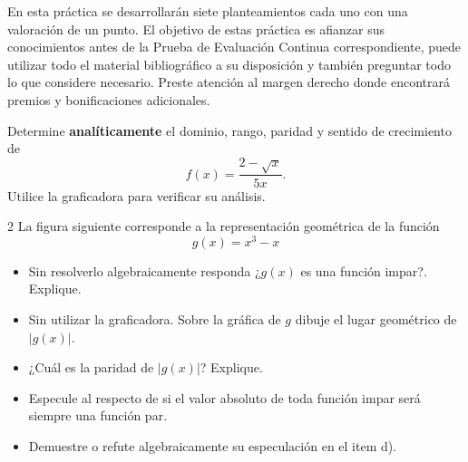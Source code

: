\documentclass[a4 paper]{article}
\begin{document}

En esta práctica se desarrollarán siete planteamientos cada uno con una valoración de un punto. El objetivo de estas práctica es afianzar sus conocimientos antes de la Prueba de Evaluación Continua correspondiente, puede utilizar todo el material bibliográfico a su disposición y también preguntar todo lo que considere necesario. Preste atención al margen derecho donde encontrará premios y bonificaciones adicionales.

\vspace{5mm}

 Determine \textbf{analíticamente} el dominio, rango, paridad y sentido de crecimiento de 
\[
  f(x) = \frac{2 - \sqrt{x}}{5x}.
\]
Utilice la graficadora para verificar su análisis.

\vskip 3mm
\solution{}
\vspace{30mm}

\begin{paracol}{2}
 La figura siguiente corresponde a la representación geométrica de la función 
\[
  g(x) = x^3 - x
\]
\begin{figure}[ht]
    \centering
\end{figure}
\switchcolumn
\begin{itemize}
    \item[a)] Sin resolverlo algebraicamente responda ¿$g(x)$ es una función impar?. Explique.
    \item[b)] Sin utilizar la graficadora. Sobre la gráfica de $g$ dibuje el lugar geométrico de $|g(x)|$.
    \item[c)] ¿Cuál es la paridad de $|g(x)|$? Explique.
    \item[d)] Especule al respecto de si el valor absoluto de toda función impar será siempre una función par.
    \item[e)] Demuestre o refute algebraicamente su especulación en el item d).
\end{itemize}
\end{paracol}
\vskip 3mm
\solution{}
\vspace{30mm}
\end{document}

